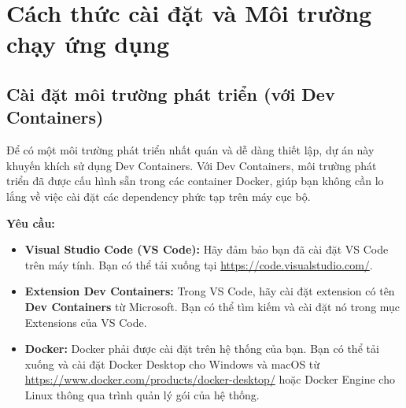 \chapter{Cách thức cài đặt và Môi trường chạy ứng dụng}
\label{ch:installation}

\section{Cài đặt môi trường phát triển (với Dev Containers)}
\label{sec:dev_environment_setup}

Để có một môi trường phát triển nhất quán và dễ dàng thiết lập, dự án này khuyến khích sử dụng Dev Containers. Với Dev Containers, môi trường phát triển đã được cấu hình sẵn trong các container Docker, giúp bạn không cần lo lắng về việc cài đặt các dependency phức tạp trên máy cục bộ.

\textbf{Yêu cầu:}
\begin{itemize}
    \item \textbf{Visual Studio Code (VS Code):} Hãy đảm bảo bạn đã cài đặt VS Code trên máy tính. Bạn có thể tải xuống tại \url{https://code.visualstudio.com/}.
    \item \textbf{Extension Dev Containers:} Trong VS Code, hãy cài đặt extension có tên \textbf{Dev Containers} từ Microsoft. Bạn có thể tìm kiếm và cài đặt nó trong mục Extensions của VS Code.
    \item \textbf{Docker:} Docker phải được cài đặt trên hệ thống của bạn. Bạn có thể tải xuống và cài đặt Docker Desktop cho Windows và macOS từ \url{https://www.docker.com/products/docker-desktop/} hoặc Docker Engine cho Linux thông qua trình quản lý gói của hệ thống.
\end{itemize}

